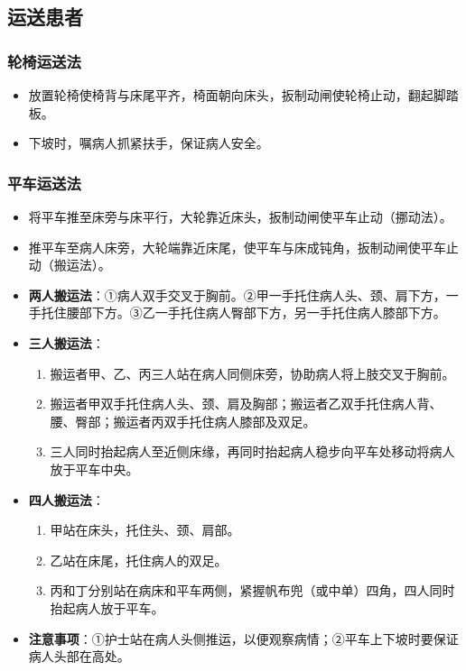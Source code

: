 \documentclass[11pt, a4paper]{ctexart}
\begin{document}
\subsection{运送患者}
\subsubsection{轮椅运送法}
\begin{itemize}
    \item 放置轮椅使椅背与床尾平齐，椅面朝向床头，扳制动闸使轮椅止动，翻起脚踏板。
    \item 下坡时，嘱病人抓紧扶手，保证病人安全。
\end{itemize}

\subsubsection{平车运送法}
\begin{itemize}
    \item 将平车推至床旁与床平行，大轮靠近床头，扳制动闸使平车止动（挪动法）。
    \item 推平车至病人床旁，大轮端靠近床尾，使平车与床成钝角，扳制动闸使平车止动（搬运法）。
    \item \textbf{两人搬运法}：①病人双手交叉于胸前。②甲一手托住病人头、颈、肩下方，一手托住腰部下方。③乙一手托住病人臀部下方，另一手托住病人膝部下方。
    \item \textbf{三人搬运法}：
    \begin{enumerate}
        \item 搬运者甲、乙、丙三人站在病人同侧床旁，协助病人将上肢交叉于胸前。
        \item 搬运者甲双手托住病人头、颈、肩及胸部；搬运者乙双手托住病人背、腰、臀部；搬运者丙双手托住病人膝部及双足。
        \item 三人同时抬起病人至近侧床缘，再同时抬起病人稳步向平车处移动将病人放于平车中央。
    \end{enumerate}
    \item \textbf{四人搬运法}：
    \begin{enumerate}
        \item 甲站在床头，托住头、颈、肩部。
        \item 乙站在床尾，托住病人的双足。
        \item 丙和丁分别站在病床和平车两侧，紧握帆布兜（或中单）四角，四人同时抬起病人放于平车。
    \end{enumerate}
    \item \textbf{注意事项}：①护士站在病人头侧推运，以便观察病情；②平车上下坡时要保证病人头部在高处。
\end{itemize}
\end{document}
